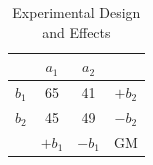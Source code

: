 \begin{table}[ht]
	\centering
	\caption{Experimental Design and Effects}
	\begin{tabular}{c|cc|c}
		      & $a_1$  & $a_2$  &        \\\hline
		$b_1$ & 65     & 41     & $+b_2$ \\
		$b_2$ & 45     & 49     & $-b_2$ \\\hline
		      & $+b_1$ & $-b_1$ & GM
	\end{tabular}
	\label{tbl::13_05}
\end{table}
